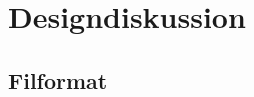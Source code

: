 \documentclass{TDP005mall}
\begin{document}
\section{Designdiskussion}%


\subsection{Filformat}


\newpage
\printbibliography
\end{document}
